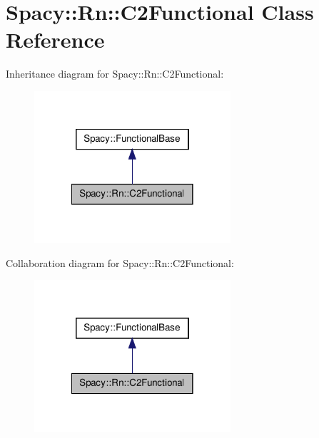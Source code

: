 \hypertarget{classSpacy_1_1Rn_1_1C2Functional}{\section{\-Spacy\-:\-:\-Rn\-:\-:\-C2\-Functional \-Class \-Reference}
\label{classSpacy_1_1Rn_1_1C2Functional}
}


\-Inheritance diagram for \-Spacy\-:\-:\-Rn\-:\-:\-C2\-Functional\-:
\nopagebreak
\begin{figure}[H]
\begin{center}
\leavevmode
\includegraphics[width=206pt]{classSpacy_1_1Rn_1_1C2Functional__inherit__graph}
\end{center}
\end{figure}


\-Collaboration diagram for \-Spacy\-:\-:\-Rn\-:\-:\-C2\-Functional\-:
\nopagebreak
\begin{figure}[H]
\begin{center}
\leavevmode
\includegraphics[width=206pt]{classSpacy_1_1Rn_1_1C2Functional__coll__graph}
\end{center}
\end{figure}
